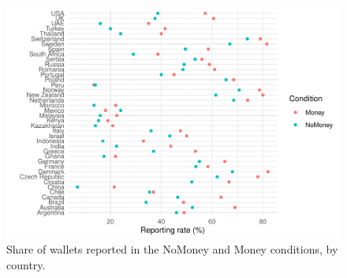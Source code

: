 \documentclass[12pt,halfline,a4paper,]{ouparticle}
\begin{document}
\begin{figure}[p]
\includegraphics[width=1\linewidth]{Civic-Honesty-Replication_files/figure-latex/Figure 1-1} \caption{Share of wallets reported in the NoMoney and Money conditions, by country.}\label{fig:Figure 1-1}
\end{figure}
\end{document}
